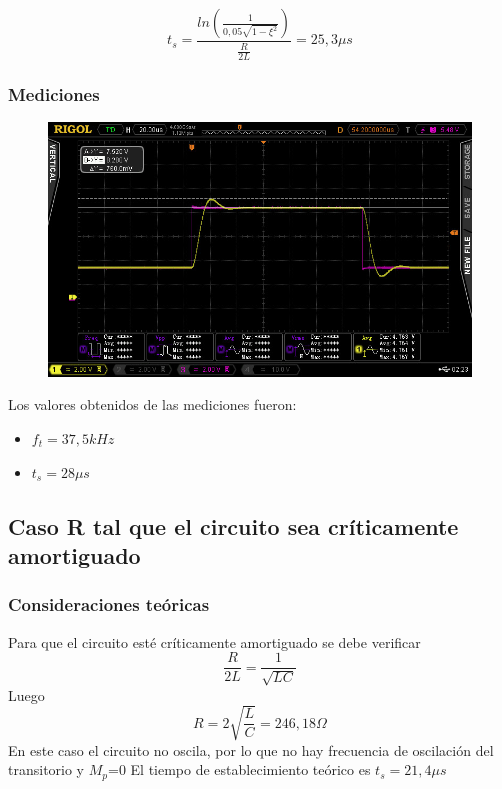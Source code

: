 \begin{equation}
    t_s=\frac{ln({\frac{1}{0,05\sqrt{1-\xi^2}}})}{\frac{R}{2L}}=25,3\mu s
\end{equation}
\subsubsection{Mediciones}

\begin{figure}[H]
  \centering
  \includegraphics[width=\textwidth]{Mediciones_pendrive_alan/Newfile3.jpeg}  
\end{figure}

Los valores obtenidos de las mediciones fueron:
\begin{itemize}
  \item $f_t= 37,5 kHz$
  \item $t_s=28\mu s$
\end{itemize}

\subsection{Caso R tal que el circuito sea críticamente amortiguado}
\subsubsection{Consideraciones teóricas}
Para que el circuito esté críticamente amortiguado se debe verificar \begin{equation}
    \frac{R}{2L}=\frac{1}{\sqrt{LC}}
\end{equation}
Luego \begin{equation}
    R=2\sqrt{\frac{L}{C}}=246,18 \Omega
\end{equation}
En este caso el circuito no oscila, por lo que no hay frecuencia de oscilación del transitorio y $M_p$=0
El tiempo de establecimiento teórico es $t_s=21,4 \mu s$

